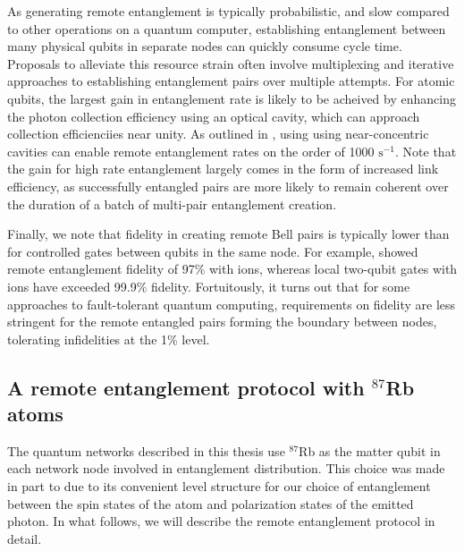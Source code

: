 As generating remote entanglement is typically probabilistic, and slow compared to other operations on a quantum computer, establishing entanglement between many physical qubits in separate nodes can quickly consume cycle time. Proposals to alleviate this resource strain often involve multiplexing\cite{Huie2021} and iterative approaches to establishing entanglement pairs over multiple attempts\cite{li2024high}. For atomic qubits, the largest gain in entanglement rate is likely to be acheived by enhancing the photon collection efficiency using an optical cavity, which can approach collection efficienciies near unity. As outlined in \cite{Young2022}, using using near-concentric cavities can enable remote entanglement rates on the order of 1000 $\text{s}^{-1}$. Note that the gain for high rate entanglement largely comes in the form of increased link efficiency, as successfully entangled pairs are more likely to remain coherent over the duration of a batch of multi-pair entanglement creation. 

Finally, we note that fidelity in creating remote Bell pairs is typically lower than for controlled gates between qubits in the same node. For example,\cite{saha2024high} showed remote entanglement fidelity of 97$\%$ with ions, whereas local two-qubit gates with ions have exceeded 99.9$\%$ fidelity\cite{harty2014high, ballance2016high, clark2021high,srinivas2021high}. Fortuitously, it turns out that for some approaches to fault-tolerant quantum computing, requirements on fidelity are less stringent for the remote entangled pairs forming the boundary between nodes, tolerating infidelities at the 1$\%$ level\cite{ramette2024fault}.

\subsection{A remote entanglement protocol with $^{87}$Rb atoms}

The quantum networks described in this thesis use $^{87}$Rb as the matter qubit in each network node involved in entanglement distribution. This choice was made in part to due to its convenient level structure for our choice of entanglement between the spin states of the atom and polarization states of the emitted photon. In what follows, we will describe the remote entanglement protocol in detail.

